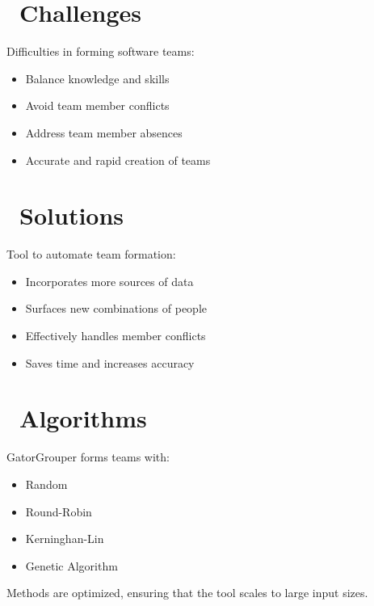 \documentclass[a0paper,fleqn]{betterposter}
\begin{document}
{  \vspace*{-.25in}
  \section{\faCube~Challenges}
  Difficulties in forming software teams:
  \begin{itemize}
    \item Balance knowledge and skills
    \item Avoid team member conflicts
    \item Address team member absences
    \item Accurate and rapid creation of teams
  \end{itemize}

  \vspace*{-.25in}
  \section{\faTrophy~Solutions}
  Tool to automate team formation:
  \begin{itemize}
    \item Incorporates more sources of data
    \item Surfaces new combinations of people
    \item Effectively handles member conflicts
    \item Saves time and increases accuracy
  \end{itemize}

  \vspace*{-.25in}
  \section{\faCog~Algorithms}
  GatorGrouper forms teams with:
  \begin{itemize}
    \item Random
    \item Round-Robin
    \item Kerninghan-Lin
    \item Genetic Algorithm
  \end{itemize}

  \vspace*{.25in}
  Methods are optimized, ensuring that the tool scales to large input sizes.
  \vspace*{.5in}

  \vfill

}
\end{document}
